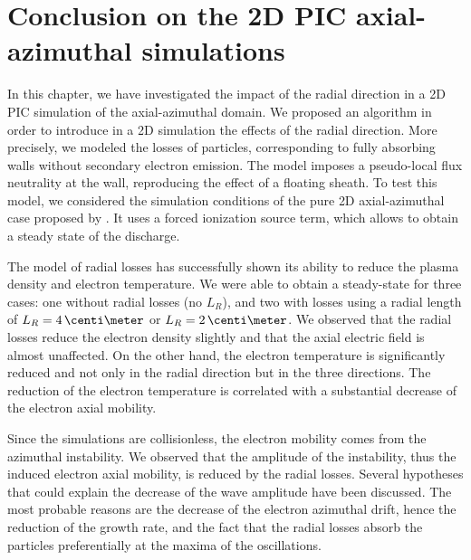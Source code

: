 


\section{Conclusion on the 2D PIC axial-azimuthal simulations}

In this chapter, we have investigated the impact of the radial direction in a \ac{2D} \ac{PIC} simulation of the axial-azimuthal domain.
We proposed an algorithm in order to introduce in a \ac{2D} \ztheta simulation the effects of the radial direction.
More precisely, we modeled the losses of particles, corresponding to fully absorbing walls without secondary electron emission.
The model imposes a pseudo-local flux neutrality at the wall, reproducing the effect of a floating sheath.
To test this model, we considered the simulation conditions of the pure \ac{2D} axial-azimuthal case proposed by \citet{boeuf2018}.
It uses a forced ionization source term, which allows to obtain a steady state of the discharge. 

The model of radial losses has successfully shown its ability to reduce the plasma density and electron temperature.
We were able to obtain a steady-state for three cases\string: one without radial losses (no $L_R$), and two with losses using a radial length of $L_R=4\,\centi\meter$ or $L_R=2\,\centi\meter$.
We observed that the radial losses reduce the electron density slightly and that the axial electric field is almost unaffected.
On the other hand, the electron temperature is significantly reduced and not only in the radial direction but in the three directions.
The reduction of the electron temperature is correlated with a substantial decrease of the electron axial mobility.

Since the simulations are collisionless, the electron mobility comes from the azimuthal instability.
We observed that the amplitude of the instability, thus the induced electron axial mobility, is reduced by the radial losses.
Several hypotheses that could explain the decrease of the wave amplitude have been discussed.
The most probable reasons are the decrease of the electron azimuthal drift, hence the reduction of the growth rate, and the fact that the radial losses absorb the particles preferentially at the maxima of the oscillations.


